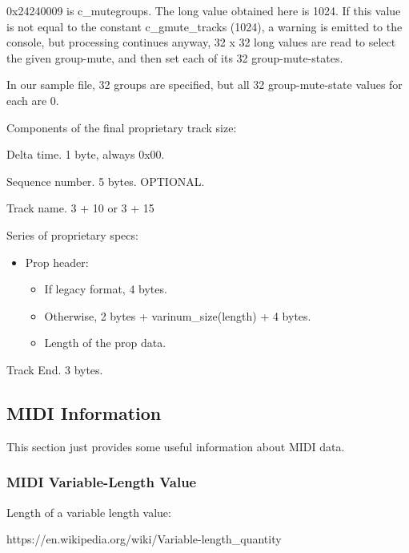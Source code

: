    0x24240009 is c\_mutegroups.  The long value obtained here is 1024.
   If this value is not equal to the constant c\_gmute\_tracks (1024), a
   warning is emitted to the console, but processing continues anyway,
   32 x 32 long values are read to select the given group-mute, and then set
   each of its 32 group-mute-states.

   In our sample file, 32 groups are specified, but all 32 group-mute-state
   values for each are 0.

Components of the final proprietary track size:

   \begin{enumber}
      \item Delta time.  1 byte, always 0x00.
      \item Sequence number.  5 bytes.  OPTIONAL.
      \item Track name. 3 + 10 or 3 + 15
      \item Series of proprietary specs:
      \begin{itemize}
         \item Prop header:
         \begin{itemize}
            \item If legacy format, 4 bytes.
            \item Otherwise, 2 bytes + varinum\_size(length) + 4 bytes.
            \item Length of the prop data.
         \end{itemize}
      \end{itemize}
      \item Track End. 3 bytes.
   \end{enumber}

\subsection{MIDI Information}
\label{subsec:midi_information}

   This section just provides some useful information about MIDI data.

\subsubsection{MIDI Variable-Length Value}
\label{subsec:midi_variable_length_value}

   Length of a variable length value:

   https://en.wikipedia.org/wiki/Variable-length\_quantity

